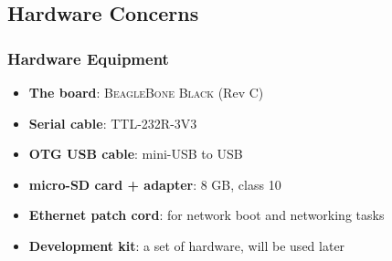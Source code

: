 \subsection{Hardware Concerns}

\begin{frame}
  \frametitle{Hardware Equipment}
  \begin{itemize}
    \item \textbf{The board}: \textsc{BeagleBone Black} (Rev C)
    \item \textbf{Serial cable}: TTL-232R-3V3
    \item \textbf{OTG USB cable}: mini-USB to USB
    \item \textbf{micro-SD card + adapter}: 8 GB, class 10
    \item \textbf{Ethernet patch cord}: for network boot and networking tasks
    \item \textbf{Development kit}: a set of hardware, will be used later
  \end{itemize}
\end{frame}

